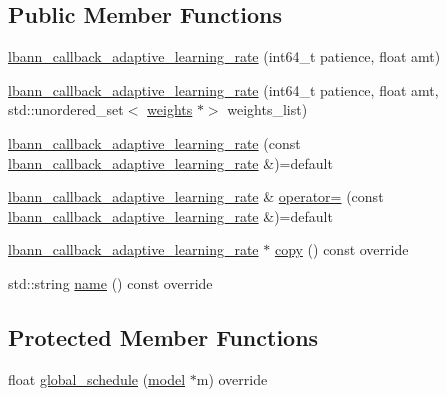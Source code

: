 \subsection*{Public Member Functions}
\begin{DoxyCompactItemize}
\item 
\hyperlink{classlbann_1_1lbann__callback__adaptive__learning__rate_a2095e4c430b3c4f206e85c963e1ec2aa}{lbann\+\_\+callback\+\_\+adaptive\+\_\+learning\+\_\+rate} (int64\+\_\+t patience, float amt)
\item 
\hyperlink{classlbann_1_1lbann__callback__adaptive__learning__rate_a49343d73d0be9782b0480c07aeda6046}{lbann\+\_\+callback\+\_\+adaptive\+\_\+learning\+\_\+rate} (int64\+\_\+t patience, float amt, std\+::unordered\+\_\+set$<$ \hyperlink{classlbann_1_1weights}{weights} $\ast$$>$ weights\+\_\+list)
\item 
\hyperlink{classlbann_1_1lbann__callback__adaptive__learning__rate_a0b2fd5ecb8eb767184951947ced9b9b7}{lbann\+\_\+callback\+\_\+adaptive\+\_\+learning\+\_\+rate} (const \hyperlink{classlbann_1_1lbann__callback__adaptive__learning__rate}{lbann\+\_\+callback\+\_\+adaptive\+\_\+learning\+\_\+rate} \&)=default
\item 
\hyperlink{classlbann_1_1lbann__callback__adaptive__learning__rate}{lbann\+\_\+callback\+\_\+adaptive\+\_\+learning\+\_\+rate} \& \hyperlink{classlbann_1_1lbann__callback__adaptive__learning__rate_a7959faa8ba665cdf1132a5c7b518b3b9}{operator=} (const \hyperlink{classlbann_1_1lbann__callback__adaptive__learning__rate}{lbann\+\_\+callback\+\_\+adaptive\+\_\+learning\+\_\+rate} \&)=default
\item 
\hyperlink{classlbann_1_1lbann__callback__adaptive__learning__rate}{lbann\+\_\+callback\+\_\+adaptive\+\_\+learning\+\_\+rate} $\ast$ \hyperlink{classlbann_1_1lbann__callback__adaptive__learning__rate_ad5f290b78276fc9c7fd54a67c4a7e6eb}{copy} () const override
\item 
std\+::string \hyperlink{classlbann_1_1lbann__callback__adaptive__learning__rate_ab7292639822b95f3907d1aaf88410b1c}{name} () const override
\end{DoxyCompactItemize}
\subsection*{Protected Member Functions}
\begin{DoxyCompactItemize}
\item 
float \hyperlink{classlbann_1_1lbann__callback__adaptive__learning__rate_a6c64fae03736b8acba5c839f59d2ac6f}{global\+\_\+schedule} (\hyperlink{classlbann_1_1model}{model} $\ast$m) override
\end{DoxyCompactItemize}
